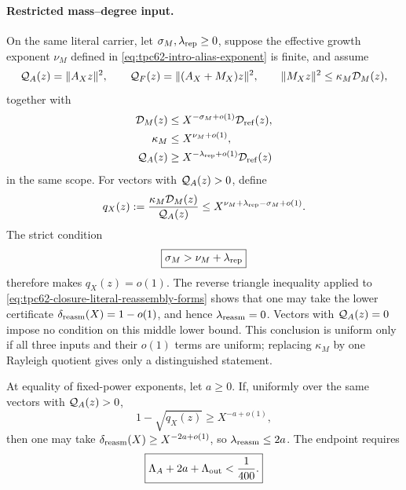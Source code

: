\paragraph{Restricted mass--degree input.}
On the same literal carrier, let
\(\sigma_M,\lambda_{\rm rep}\ge0\), suppose the effective growth exponent
\(\nu_M\) defined in \eqref{eq:tpc62-intro-alias-exponent} is finite, and
assume
\begin{equation}
 \mathcal Q_A(z)=\|A_Xz\|^2,\qquad
 \mathcal Q_F(z)=\|(A_X+M_X)z\|^2,\qquad
 \|M_Xz\|^2\le\kappa_M\mathcal D_M(z),
 \label{eq:tpc62-closure-literal-reassembly-forms}
\end{equation}
together with
\begin{align}
 \mathcal D_M(z)&\le X^{-\sigma_M+o(1)}\mathcal D_{\rm ref}(z),
 \label{eq:tpc62-closure-missing-saving}\\
 \kappa_M&\le X^{\nu_M+o(1)},
 \label{eq:tpc62-closure-kappa-bound}\\
 \mathcal Q_A(z)&\ge
 X^{-\lambda_{\rm rep}+o(1)}\mathcal D_{\rm ref}(z)
 \label{eq:tpc62-closure-represented-reference}
\end{align}
in the same scope.  For vectors with \(\mathcal Q_A(z)>0\), define
\begin{equation}
 q_X(z):=
 \frac{\kappa_M\mathcal D_M(z)}{\mathcal Q_A(z)}
 \le
 X^{\nu_M+\lambda_{\rm rep}-\sigma_M+o(1)}.
 \label{eq:tpc62-closure-effective-product}
\end{equation}
The strict condition
\begin{equation}
\boxed{\sigma_M>\nu_M+\lambda_{\rm rep}}
 \label{eq:tpc62-closure-strict-effective-product}
\end{equation}
therefore makes \(q_X(z)=o(1)\).  The reverse triangle inequality applied
to \eqref{eq:tpc62-closure-literal-reassembly-forms} shows that one may
take the lower certificate
\(\delta_{\rm reasm}(X)=1-o(1)\), and hence
\(\lambda_{\rm reasm}=0\).  Vectors with \(\mathcal Q_A(z)=0\) impose no
condition on this middle lower bound.  This conclusion is uniform only if
all three inputs and their \(o(1)\) terms are uniform; replacing
\(\kappa_M\) by one Rayleigh quotient gives only a distinguished
statement.

At equality of fixed-power exponents, let \(a\ge0\).  If, uniformly over the same vectors
with \(\mathcal Q_A(z)>0\),
\begin{equation}
 1-\sqrt{q_X(z)}\ge X^{-a+o(1)},
 \label{eq:tpc62-closure-critical-margin}
\end{equation}
then one may take
\(\delta_{\rm reasm}(X)\ge X^{-2a+o(1)}\), so
\(\lambda_{\rm reasm}\le2a\).  The endpoint requires
\begin{equation}
 \boxed{
 \Lambda_A+2a+\Lambda_{\rm out}<\frac1{400}.}
 \label{eq:tpc62-closure-critical-endpoint}
\end{equation}

